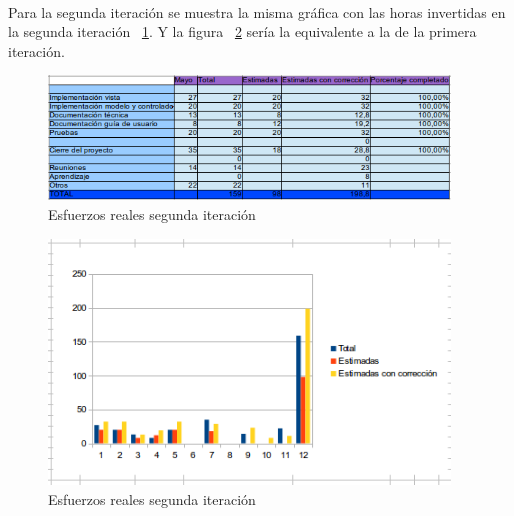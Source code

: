 \paragraph{} Para la segunda iteración se muestra la misma gráfica con las horas invertidas en la segunda iteración ~\cref{fig:6163}. Y la figura ~\cref{fig:6164} sería la equivalente a la de la primera iteración.

\begin{figure}[h!]
\centering
\includegraphics[width=0.95\textwidth]{img/6163}
\caption{Esfuerzos reales segunda iteración}
 \label{fig:6163}
\end{figure}

\begin{figure}[h!]
\centering
\includegraphics[width=0.95\textwidth]{img/6164}
\caption{Esfuerzos reales segunda iteración}
 \label{fig:6164}
\end{figure}